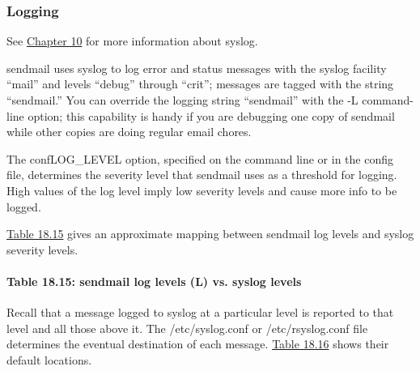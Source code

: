 \subsubsection[Logging]{\texorpdfstring{\protect\hypertarget{part0026_split_039.htmlux5cux23_idTextAnchor1119}{}{}Logging}{Logging}}

\leavevmode\hypertarget{part0026_split_039.htmlux5cux23_idContainer1173}{}%
See
\protect\hyperlink{part0017_split_000.htmlux5cux23_idTextAnchor493}{Chapter
10} for more information about syslog.

{\protect\hypertarget{part0026_split_039.htmlux5cux23_idIndexMarker2605}{}{}}{sendmail}
uses syslog to log error and status messages with the syslog facility
``mail'' and levels ``debug'' through ``crit''; messages are tagged with
the string ``sendmail.'' You can override the logging string
``sendmail'' with the {-L} command-line option; this capability is handy
if you are debugging one copy of {sendmail} while other copies are doing
regular email chores.

The
\protect\hypertarget{part0026_split_039.htmlux5cux23_idIndexMarker2606}{}{}{confLOG\_LEVE\protect\hypertarget{part0026_split_039.htmlux5cux23_idTextAnchor1120}{}{}L}
option, specified on the command line or in the config file, determines
the severity level that {sendmail} uses as a threshold for logging.
Hig\protect\hypertarget{part0026_split_039.htmlux5cux23_idTextAnchor1121}{}{}h
values of the log level imply low severity levels and cause more info to
be logged.

\protect\hyperlink{part0026_split_039.htmlux5cux23_idTextAnchor1122}{Table
18.15} gives an approximate mapping between {sendmail} log levels and
syslog severity levels.

\paragraph[{Table 18.15: } log levels (L) vs. syslog
levels]{\texorpdfstring{{Table 18.15:
}{\protect\hypertarget{part0026_split_039.htmlux5cux23_idTextAnchor1122}{}{}\protect\hypertarget{part0026_split_039.htmlux5cux23_idTextAnchor1123}{}{}sendmail}
log levels (L) vs. syslog
levels}{Table 18.15: sendmail log levels (L) vs. syslog levels}}


Recall that a message logged to syslog at a particular level is reported
to that level and all those above it. The {/etc/syslog.conf} or
{/etc/rsyslog.conf} file determines the eventual destination of each
message.
\protect\hyperlink{part0026_split_039.htmlux5cux23_idTextAnchor1124}{Table
18.16} shows their default locations.


